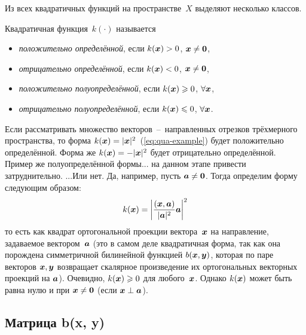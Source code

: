 \documentclass[a4paper,12pt]{article}
\begin{document}
  Из всех квадратичных функций на пространстве~$X$ выделяют несколько классов.
  
  \begin{definition}
    Квадратичная функция~$k(\cdot)$ называется
    \begin{itemize}
      \item \emph{положительно определённой}, если $k(\bds x) \hm> 0$, $\bds x \hm{\not=} \bds 0$,
      \item \emph{отрицательно определённой}, если $k(\bds x) \hm< 0$, $\bds x \hm{\not=} \bds 0$,
      \item \emph{положительно полуопределённой}, если $k(\bds x) \hm\geq 0$, $\forall \boldsymbol x$,
      \item \emph{отрицательно полуопределённой}, если $k(\bds x) \hm\leq 0$, $\forall \boldsymbol x$.
    \end{itemize}
  \end{definition}
  
  \begin{example}
    Если рассматривать множество векторов~--~направленных отрезков трёхмерного пространства, то форма $k(\bds x) \hm= |\bds x|^2$~(\ref{eq:qua-example}) будет положительно определённой.
    Форма же $k(\bds x) \hm= -|\bds x|^2$ будет отрицательно определённой.
    Пример же полуопределённой формы... на данном этапе привести затруднительно.
    ...Или нет.
    Да, например, пусть $\bds a \hm{\not=} \bds 0$.
    Тогда определим форму следующим образом:
    \[
      k(\boldsymbol x) = \left|\frac{(\boldsymbol x, \boldsymbol a)}{|\boldsymbol a|^2} \boldsymbol a\right|^2
    \]
    то есть как квадрат ортогональной проекции вектора~$\boldsymbol x$ на направление, задаваемое вектором~$\boldsymbol a$ (это в самом деле квадратичная форма, так как она порождена симметричной билинейной функцией $b(\boldsymbol x, \boldsymbol y)$, которая по паре векторов $\boldsymbol x, \boldsymbol y$ возвращает скалярное произведение их ортогональных векторных проекций на $\boldsymbol a$).
    Очевидно, $k(\bds x) \hm\geq 0$ для любого~$\boldsymbol x$.
    Однако $k(\boldsymbol x)$ может быть равна нулю и при $\bds x \hm{\not=} \bds 0$ (если $\bds x \hm\perp \bds a$). 
  \end{example}
  
  
  \subsection{Матрица b(x, y)}
  
\end{document}
